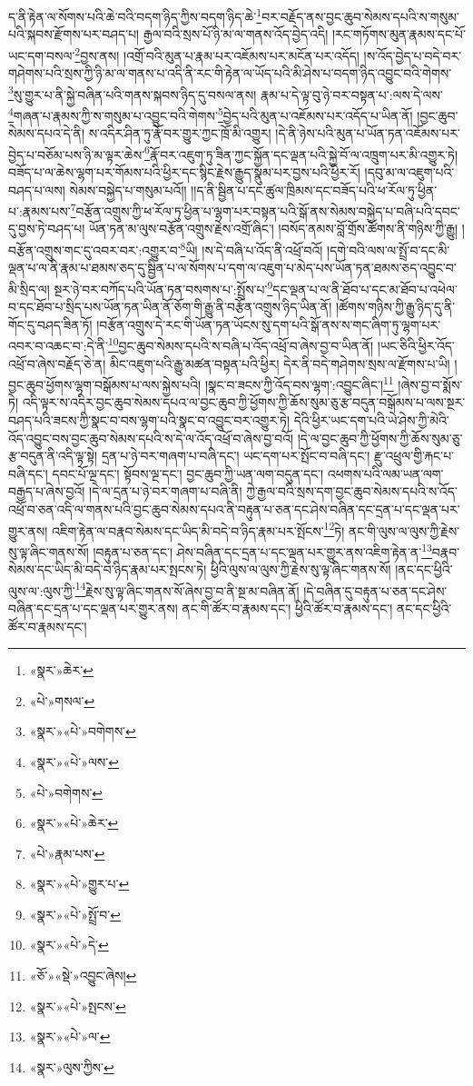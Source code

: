 ད་ནི་རྟེན་ལ་སོགས་པའི་ཆེ་བའི་བདག་ཉིད་ཀྱིས་བདག་ཉིད་ཆེ་\footnote{«སྣར་»ཆེར་}བར་བརྗོད་ནས་བྱང་ཆུབ་སེམས་དཔའི་ས་གསུམ་པའི་སྐབས་རྫོགས་པར་བཤད་པ། རྒྱལ་བའི་སྲས་པོ་ཉི་མ་ལ་གནས་འོད་བྱེད་འདི། །རང་གཏོགས་མུན་རྣམས་དང་པོ་ཡང་དག་བསལ་\footnote{«པེ་»གསལ་}བྱས་ནས། །འགྲོ་བའི་མུན་པ་རྣམ་པར་འཇོམས་པར་མངོན་པར་འདོད། །ས་འོད་བྱེད་པ་བདེ་བར་གཤེགས་པའི་སྲས་ཀྱི་ཉི་མ་ལ་གནས་པ་འདི་ནི་རང་གི་རྟེན་ལ་ཡོད་པའི་མི་ཤེས་པ་བདག་ཉིད་འབྱུང་བའི་གེགས་\footnote{«སྣར་»«པེ་»བགེགས་}སུ་གྱུར་པ་ནི་སྐྱེ་བཞིན་པའི་གནས་སྐབས་ཉིད་དུ་བསལ་ནས། རྣམ་པ་དེ་ལྟ་བུ་ཉེ་བར་བསྟན་པ་:ལས་དེ་ལས་\footnote{«སྣར་»«པེ་»ལས་}གཞན་པ་རྣམས་ཀྱི་ས་གསུམ་པ་འབྱུང་བའི་གེགས་\footnote{«པེ་»བགེགས་}བྱེད་པའི་མུན་པ་འཇོམས་པར་འདོད་པ་ཡིན་ནོ། །བྱང་ཆུབ་སེམས་དཔའ་དེ་ནི། ས་འདིར་ཤིན་ཏུ་རྣོ་བར་གྱུར་ཀྱང་ཁྲོ་མི་འགྱུར། །དེ་ནི་ཉེས་པའི་མུན་པ་ཡོན་ཏན་འཇོམས་པར་བྱེད་པ་བཅོམ་པས་ཉི་མ་ལྟར་ཆེས་\footnote{«སྣར་»«པེ་»ཆེར་}རྣོ་བར་འཇུག་ཏུ་ཟིན་ཀྱང་སྐྱོན་དང་ལྡན་པའི་སྐྱེ་བོ་ལ་འཁྲུག་པར་མི་འགྱུར་ཏེ། བཟོད་པ་ལ་ཆེས་ལྷག་པར་གོམས་པའི་ཕྱིར་དང་སྙིང་རྗེས་རྒྱུད་སྣུམ་པར་བྱས་པའི་ཕྱིར་རོ། །དབུ་མ་ལ་འཇུག་པའི་བཤད་པ་ལས། སེམས་བསྐྱེད་པ་གསུམ་པའོ།། །།ད་ནི་སྦྱིན་པ་དང་ཚུལ་ཁྲིམས་དང་བཟོད་པའི་ཕ་རོལ་ཏུ་ཕྱིན་པ་:རྣམས་པས་\footnote{«པེ་»རྣམ་པས་}བརྩོན་འགྲུས་ཀྱི་ཕ་རོལ་ཏུ་ཕྱིན་པ་ལྷག་པར་བསྟན་པའི་སྒོ་ནས་སེམས་བསྐྱེད་པ་བཞི་པའི་དབང་དུ་བྱས་ཏེ་བཤད་པ། ཡོན་ཏན་མ་ལུས་བརྩོན་འགྲུས་རྗེས་འགྲོ་ཞིང་། །བསོད་ནམས་བློ་གྲོས་ཚོགས་ནི་གཉིས་ཀྱི་རྒྱུ། །བརྩོན་འགྲུས་གང་དུ་འབར་བར་:འགྱུར་བ་\footnote{«སྣར་»«པེ་»གྱུར་པ་}ཡི། །ས་དེ་བཞི་པ་འོད་ནི་འཕྲོ་བའོ། །དགེ་བའི་ལས་ལ་སྤྲོ་བ་དང་མི་ལྡན་པ་ལ་ནི་རྣམ་པ་ཐམས་ཅད་དུ་སྦྱིན་པ་ལ་སོགས་པ་དག་ལ་འཇུག་པ་མེད་པས་ཡོན་ཏན་ཐམས་ཅད་འབྱུང་བ་མི་སྲིད་ལ། སྔར་ཉེ་བར་བཀོད་པའི་ཡོན་ཏན་བསགས་པ་:སྤྲོས་པ་\footnote{«སྣར་»«པེ་»སྤྲོ་བ་}དང་ལྡན་པ་ལ་ནི་ཐོབ་པ་དང་མ་ཐོབ་པ་འཕེལ་བ་དང་ཐོབ་པ་སྲིད་པས་ཡོན་ཏན་ཡིན་ནོ་ཅོག་གི་རྒྱུ་ནི་བརྩོན་འགྲུས་ཉིད་ཡིན་ནོ། །ཚོགས་གཉིས་ཀྱི་རྒྱུ་ཉིད་དུ་ནི་གོང་དུ་བཤད་ཟིན་ཏོ། །བརྩོན་འགྲུས་དེ་རང་གི་ཡོན་ཏན་ཡོངས་སུ་དག་པའི་སྒོ་ནས་ས་གང་ཞིག་ཏུ་ལྷག་པར་འབར་བ་འཆང་བ་:དེ་ནི་\footnote{«སྣར་»«པེ་»དེ་}བྱང་ཆུབ་སེམས་དཔའི་ས་བཞི་པ་འོད་འཕྲོ་བ་ཞེས་བྱ་བ་ཡིན་ནོ། །ཡང་ཅིའི་ཕྱིར་འོད་འཕྲོ་བ་ཞེས་བརྗོད་ཅེ་ན། མིང་འཇུག་པའི་རྒྱུ་མཚན་བསྟན་པའི་ཕྱིར། དེར་ནི་བདེ་གཤེགས་སྲས་ལ་རྫོགས་པ་ཡི། །བྱང་ཆུབ་ཕྱོགས་ལྷག་བསྒོམས་པ་ལས་སྐྱེས་པའི། །སྣང་བ་ཟངས་ཀྱི་འོད་བས་ལྷག་:འབྱུང་ཞིང་།\footnote{«ཅོ་»«སྡེ་»འབྱུང་ཞེས།} །ཞེས་བྱ་བ་སྨོས་ཏེ། འདི་ལྟར་ས་འདིར་བྱང་ཆུབ་སེམས་དཔའ་ལ་བྱང་ཆུབ་ཀྱི་ཕྱོགས་ཀྱི་ཆོས་སུམ་ཅུ་རྩ་བདུན་བསྒོམས་པ་ལས་སྔར་བཤད་པའི་ཟངས་ཀྱི་སྣང་བ་བས་ལྷག་པའི་སྣང་བ་འབྱུང་བར་འགྱུར་ཏེ། དེའི་ཕྱིར་ཡང་དག་པའི་ཡེ་ཤེས་ཀྱི་མེའི་འོད་འབྱུང་བས་བྱང་ཆུབ་སེམས་དཔའི་ས་དེ་ལ་འོད་འཕྲོ་བ་ཞེས་བྱ་བའོ། །དེ་ལ་བྱང་ཆུབ་ཀྱི་ཕྱོགས་ཀྱི་ཆོས་སུམ་ཅུ་རྩ་བདུན་ནི་འདི་ལྟ་སྟེ། དྲན་པ་ཉེ་བར་གཞག་པ་བཞི་དང་། ཡང་དག་པར་སྤོང་བ་བཞི་དང་། རྫུ་འཕྲུལ་གྱི་རྐང་པ་བཞི་དང་། དབང་པོ་ལྔ་དང་། སྟོབས་ལྔ་དང་། བྱང་ཆུབ་ཀྱི་ཡན་ལག་བདུན་དང་། འཕགས་པའི་ལམ་ཡན་ལག་བརྒྱད་པ་ཞེས་བྱའོ། །དེ་ལ་དྲན་པ་ཉེ་བར་གཞག་པ་བཞི་ནི། ཀྱེ་རྒྱལ་བའི་སྲས་དག་བྱང་ཆུབ་སེམས་དཔའི་ས་འོད་འཕྲོ་བ་ཅན་འདི་ལ་གནས་པའི་བྱང་ཆུབ་སེམས་དཔའ་ནི་བརྟུན་པ་ཅན་དང་ཤེས་བཞིན་དང་དྲན་པ་དང་ལྡན་པར་གྱུར་ནས། འཇིག་རྟེན་ལ་བརྣབ་སེམས་དང་ཡིད་མི་བདེ་བ་ཉིད་རྣམ་པར་སྤོངས་\footnote{«སྣར་»«པེ་»སྤངས་}ཏེ། ནང་གི་ལུས་ལ་ལུས་ཀྱི་རྗེས་སུ་ལྟ་ཞིང་གནས་སོ། །བརྟུན་པ་ཅན་དང་། ཤེས་བཞིན་དང་དྲན་པ་དང་ལྡན་པར་གྱུར་ནས་འཇིག་རྟེན་ན་\footnote{«སྣར་»«པེ་»ལ་}བརྣབ་སེམས་དང་ཡིད་མི་བདེ་བ་ཉིད་རྣམ་པར་སྤངས་ཏེ། ཕྱིའི་ལུས་ལ་ལུས་ཀྱི་རྗེས་སུ་ལྟ་ཞིང་གནས་སོ། །ནང་དང་ཕྱིའི་ལུས་ལ་:ལུས་ཀྱི་\footnote{«སྣར་»ལུས་ཀྱིས་}རྗེས་སུ་ལྟ་ཞིང་གནས་སོ་ཞེས་བྱ་བ་ནི་སྔ་མ་བཞིན་ནོ། །དེ་བཞིན་དུ་བརྟུན་པ་ཅན་དང་ཤེས་བཞིན་དང་དྲན་པ་དང་ལྡན་པར་གྱུར་ནས། ནང་གི་ཚོར་བ་རྣམས་དང་། ཕྱིའི་ཚོར་བ་རྣམས་དང་། ནང་དང་ཕྱིའི་ཚོར་བ་རྣམས་དང་། 